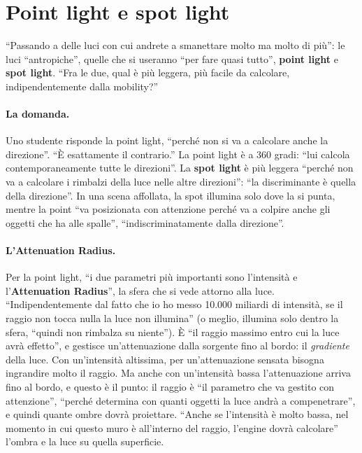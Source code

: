 \section{Point light e spot light}
\label{ue13:sec:point}

``Passando a delle luci con cui andrete a smanettare molto ma molto di più'': le luci
``antropiche'', quelle che si useranno ``per fare quasi tutto'', \textbf{point light} e
\textbf{spot light}. ``Fra le due, qual è più leggera, più facile da calcolare,
indipendentemente dalla mobility?''

\paragraph{La domanda.} Uno studente risponde la point light, ``perché non si va a calcolare
anche la direzione''. ``È esattamente il contrario.'' La point light è a 360 gradi: ``lui
calcola contemporaneamente tutte le direzioni''. La \textbf{spot light} è più leggera
``perché non va a calcolare i rimbalzi della luce nelle altre direzioni'': ``la discriminante
è quella della direzione''. In una scena affollata, la spot illumina solo dove la si punta,
mentre la point ``va posizionata con attenzione perché va a colpire anche gli oggetti che ha
alle spalle'', ``indiscriminatamente dalla direzione''.

\paragraph{L'Attenuation Radius.} Per la point light, ``i due parametri più importanti sono
l'intensità e l'\textbf{Attenuation Radius}'', la sfera che si vede attorno alla luce.
``Indipendentemente dal fatto che io ho messo 10.000 miliardi di intensità, se il raggio non
tocca nulla la luce non illumina'' (o meglio, illumina solo dentro la sfera, ``quindi non
rimbalza su niente''). È ``il raggio massimo entro cui la luce avrà effetto'', e gestisce
un'attenuazione dalla sorgente fino al bordo: il \emph{gradiente} della luce. Con
un'intensità altissima, per un'attenuazione sensata bisogna ingrandire molto il raggio. Ma
anche con un'intensità bassa l'attenuazione arriva fino al bordo, e questo è il punto: il
raggio è ``il parametro che va gestito con attenzione'', ``perché determina con quanti
oggetti la luce andrà a compenetrare'', e quindi quante ombre dovrà proiettare. ``Anche se
l'intensità è molto bassa, nel momento in cui questo muro è all'interno del raggio,
l'engine dovrà calcolare'' l'ombra e la luce su quella superficie.

